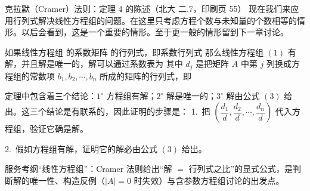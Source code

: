 \begin{fdeep}{克拉默（Cramer）法则：定理 4 的陈述（北大 二.7，印刷页 55）}
现在我们来应用行列式解决线性方程组的问题。在这里只考虑方程个数与未知量的个数相等的情形。以后会看到，这是一个重要的情形。至于更一般的情形留到下一章讨论。

\quad 如果线性方程组
的系数矩阵
的行列式，即系数行列式
那么线性方程组 $(1)$ 有解，并且解是唯一的，解可以通过系数表为
其中 $d_j$ 是把矩阵 $A$ 中第 $j$ 列换成方程组的常数项 $b_1,b_2,\cdots,b_n$ 所成的矩阵的行列式，即

定理中包含着三个结论：$1^{\circ}$ 方程组有解；$2^{\circ}$ 解是唯一的；$3^{\circ}$ 解由公式 $(3)$ 给出。这三个结论是有联系的，因此证明的步骤是：
1.\ 把 $\left(\dfrac{d_1}{d},\dfrac{d_2}{d},\cdots,\dfrac{d_n}{d}\right)$ 代入方程组，验证它确是解。

2.\ 假如方程组有解，证明它的解必由公式 $(3)$ 给出。

\fbref{}服务考纲“线性方程组”：Cramer 法则给出“解 $=$ 行列式之比”的显式公式，是判断解的唯一性、构造反例（$|A|=0$ 时失效）与含参数方程组讨论的出发点。
\end{fdeep}

